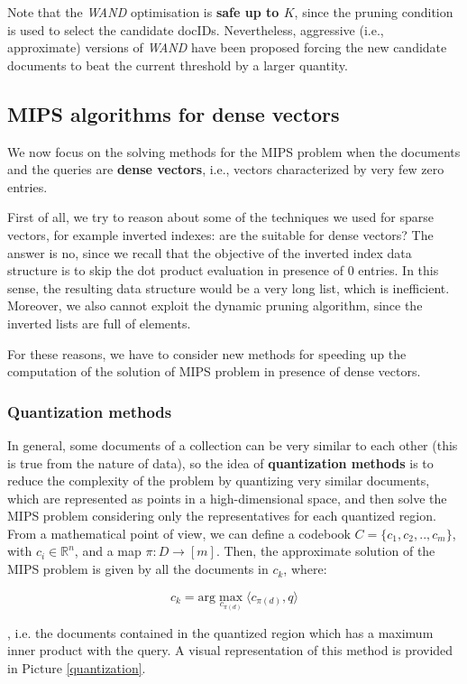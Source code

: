 Note that the \textit{WAND} optimisation is \textbf{safe up to $K$}, since the pruning condition is used to select the candidate docIDs. Nevertheless, aggressive (i.e., approximate) versions of \textit{WAND} have been proposed forcing the new candidate documents to beat the current threshold by a larger quantity.

\subsection{MIPS algorithms for dense vectors}\label{mips for dense}
We now focus on the solving methods for the MIPS problem when the documents and the queries are \textbf{dense vectors}, i.e., vectors characterized by very few zero entries. 

First of all, we try to reason about some of the techniques we used for sparse vectors, for example inverted indexes: are the suitable for dense vectors? The answer is no, since we recall that the objective of the inverted index data structure is to skip the dot product evaluation in presence of 0 entries. In this sense, the resulting data structure would be a very long list, which is inefficient. Moreover, we also cannot exploit the dynamic pruning algorithm, since the inverted lists are full of elements.

For these reasons, we have to consider new methods for speeding up the computation of the solution of MIPS problem in presence of dense vectors.

\subsubsection{Quantization methods}
In general, some documents of a collection can be very similar to each other (this is true from the nature of data), so the idea of \textbf{quantization methods} is to reduce the complexity of the problem by quantizing very similar documents, which are represented as points in a high-dimensional space, and then solve the MIPS problem considering only the representatives for each quantized region. From a mathematical point of view, we can define a codebook $C = \{ c_1, c_2, .., c_m \}$, with $c_i \in \mathbb{R}^n$, and a map $\pi : D \to [m]$. Then, the approximate solution of the MIPS problem is given by all the documents in $c_k$, where:

$$
c_k = \text{arg}\max_{c_{\pi(d)}} \langle c_{\pi(d)}, q \rangle
$$

, i.e. the documents contained in the quantized region which has a maximum inner product with the query. A visual representation of this method is provided in Picture \ref{quantization}.

